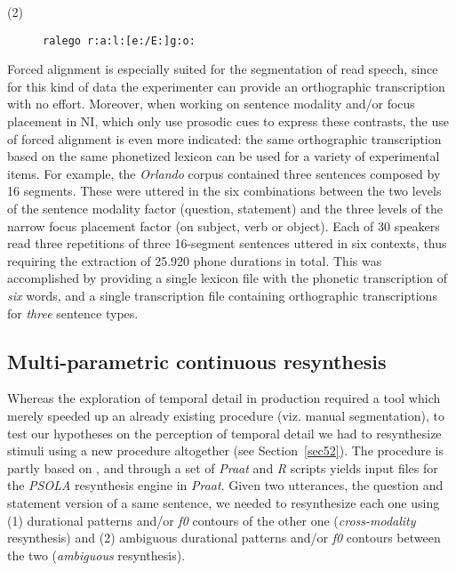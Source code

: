 \begin{description}
   \item[(2)] {\tt ralego r:a:l:[e:/E:]g:o:}
\end{description}\label{ex62}

Forced alignment is especially suited for the segmentation of read speech, since for this kind of data the experimenter can provide an orthographic transcription with no effort. Moreover, when working on sentence modality and/or focus placement in NI, which only use prosodic cues to express these contrasts, the use of forced alignment is even more indicated: the same orthographic transcription based on the same phonetized lexicon can be used for a variety of experimental items. For example, the \textit{Orlando} corpus contained three sentences composed by 16 segments. These were uttered in the six combinations between the two levels of the sentence modality factor (question, statement) and the three levels of the narrow focus placement factor (on subject, verb or object). Each of 30 speakers read three repetitions of three 16-segment sentences uttered in six contexts, thus requiring the extraction of 25.920 phone durations in total. This was accomplished by providing a single lexicon file with the phonetic transcription of \textit{six} words, and a single transcription file containing orthographic transcriptions for \textit{three} sentence types.

\subsection{Multi-parametric continuous resynthesis}\label{sec622}
Whereas the exploration of temporal detail in production required a tool which merely speeded up an already existing procedure (viz. manual segmentation), to test our hypotheses on the perception of temporal detail we had to resynthesize stimuli using a new procedure altogether (see Section~\ref{sec52}). The procedure is partly based on \citet{gubian2010automatic,gubian2011joint}, and through a set of \textit{Praat} \citep{boersma2008praat} and \textit{R} \citep{r2008r} scripts yields input files for the \textit{PSOLA} \citep{moulines1990pitchsyncronous} resynthesis engine in \textit{Praat}. Given two utterances, the question and statement version of a same sentence, we needed to resynthesize each one using (1) durational patterns and/or \textit{f0} contours of the other one (\textit{cross-modality} resynthesis) and (2) ambiguous durational patterns and/or \textit{f0} contours between the two (\textit{ambiguous} resynthesis).

